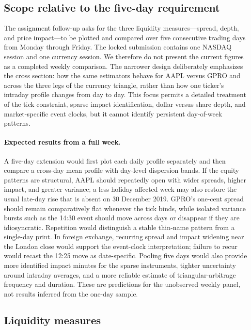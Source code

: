 \documentclass[11pt]{article}
\begin{document}
\subsection{Scope relative to the five-day requirement}
\label{sec:week}

The assignment follow-up asks for the three liquidity measures---spread, depth, and price impact---to be plotted and compared over five consecutive trading days from Monday through Friday. The locked submission contains one NASDAQ session and one currency session. We therefore do not present the current figures as a completed weekly comparison. The narrower design deliberately emphasizes the cross section: how the same estimators behave for AAPL versus GPRO and across the three legs of the currency triangle, rather than how one ticker's intraday profile changes from day to day. This focus permits a detailed treatment of the tick constraint, sparse impact identification, dollar versus share depth, and market-specific event clocks, but it cannot identify persistent day-of-week patterns.

\paragraph{Expected results from a full week.}
A five-day extension would first plot each daily profile separately and then compare a cross-day mean profile with day-level dispersion bands. If the equity patterns are structural, AAPL should repeatedly open with wider spreads, higher impact, and greater variance; a less holiday-affected week may also restore the usual late-day rise that is absent on 30 December 2019. GPRO's one-cent spread should remain comparatively flat whenever the tick binds, while isolated variance bursts such as the 14:30 event should move across days or disappear if they are idiosyncratic. Repetition would distinguish a stable thin-name pattern from a single-day print. In foreign exchange, recurring spread and impact widening near the London close would support the event-clock interpretation; failure to recur would recast the 12:25 move as date-specific. Pooling five days would also provide more identified impact minutes for the sparse instruments, tighter uncertainty around intraday averages, and a more reliable estimate of triangular-arbitrage frequency and duration. These are predictions for the unobserved weekly panel, not results inferred from the one-day sample.

\subsection{Liquidity measures}
\end{document}
